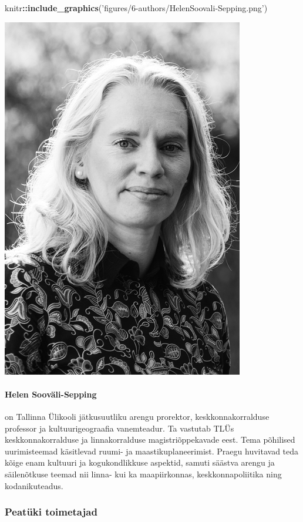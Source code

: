 \documentclass[estonian,]{article}
\newenvironment{Shaded}{\begin{snugshade}}{\end{snugshade}}
\newcommand{\KeywordTok}[1]{\textcolor[rgb]{0.13,0.29,0.53}{\textbf{#1}}}
\newcommand{\NormalTok}[1]{#1}
\newcommand{\OperatorTok}[1]{\textcolor[rgb]{0.81,0.36,0.00}{\textbf{#1}}}
\newcommand{\StringTok}[1]{\textcolor[rgb]{0.31,0.60,0.02}{#1}}
\let\oldparagraph\paragraph
\renewcommand{\paragraph}[1]{\oldparagraph{#1}\mbox{}}
\begin{document}
\begin{Shaded}
\begin{Highlighting}[]
\NormalTok{knitr}\OperatorTok{::}\KeywordTok{include_graphics}\NormalTok{(}\StringTok{'figures/6-authors/HelenSoovali-Sepping.png'}\NormalTok{)}
\end{Highlighting}
\end{Shaded}

\begin{flushleft}\includegraphics[width=0.5\linewidth]{figures/6-authors/HelenSoovali-Sepping} \end{flushleft}

\hypertarget{helen-soovuxe4li-sepping}{%
\paragraph{Helen Sooväli-Sepping}\label{helen-soovuxe4li-sepping}}

on Tallinna Ülikooli jätkusuutliku arengu prorektor, keskkonnakorralduse professor ja kultuurigeograafia vanemteadur. Ta vastutab TLÜs keskkonnakorralduse ja linnakorralduse magistriõppekavade eest. Tema põhilised uurimisteemad käsitlevad ruumi- ja maastikuplaneerimist. Praegu huvitavad teda kõige enam kultuuri ja kogukondlikkuse aspektid, samuti säästva arengu ja säilenõtkuse teemad nii linna- kui ka maapiirkonnas, keskkonnapoliitika ning kodanikuteadus.

\hypertarget{peatuxfcki-toimetajad}{%
\subsubsection*{Peatüki toimetajad}\label{peatuxfcki-toimetajad}}
\end{document}
